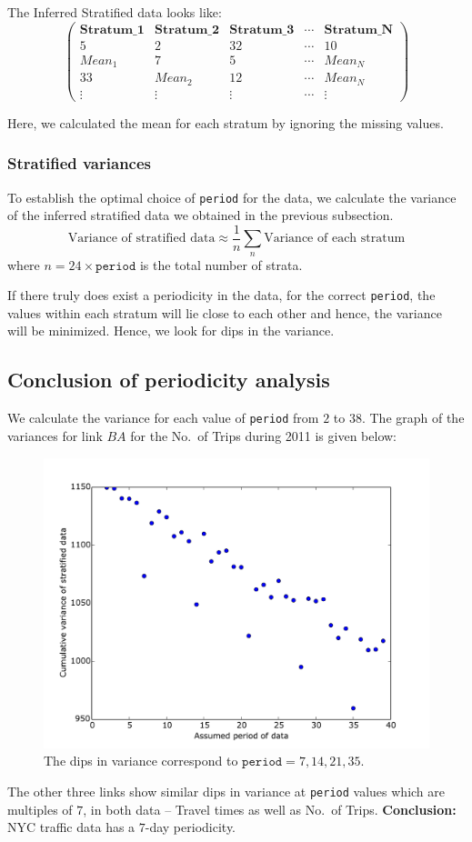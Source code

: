 \documentclass[10pt,a4paper]{amsart}
\begin{document}
The Inferred Stratified data looks like:
	\[ \left( \begin{array}{ccccc}
	\mathbf{Stratum\_1} & \mathbf{Stratum\_2} & \mathbf{Stratum\_3} & \cdots &
		\mathbf{Stratum\_N} \\
	5 & 2 & 32 & \cdots & 10 \\
	Mean_1 & 7 & 5 & \cdots & Mean_N \\
	33 & Mean_2 & 12 & \cdots & Mean_N \\
	\vdots & \vdots & \vdots & \cdots & \vdots
	\end{array} \right)\]

Here, we calculated the mean for each stratum by ignoring the missing values.

\subsubsection{Stratified variances}
To establish the optimal choice of \texttt{period} for the data, we calculate
the variance of the inferred stratified data we obtained in the previous
subsection.
	\[\text{Variance of stratified data} \approx \frac{1}{n}
		\sum_n{\text{Variance of each stratum}}\]
where \(n=24\times\mathtt{period}\) is the total number of strata.

If there truly does exist a periodicity in the data, for the correct
\texttt{period}, the values within each stratum will lie close to each other
and hence, the variance will be minimized. Hence, we look for dips in the
variance.

\subsection{Conclusion of periodicity analysis}
We calculate the variance for each value of \texttt{period} from \(2\) to
\(38\). The graph of the variances for link \(BA\) for the No.\ of Trips
during 2011 is given below:

\begin{figure}[hbtp]
\centering
\caption{The dips in variance correspond to \(\mathtt{period}=7,14,21,35\).}
\includegraphics[scale=0.5]{Periodicity_analysis_BA_Trips.pdf}
\end{figure}

The other three links show similar dips in variance at \texttt{period} values
which are multiples of \(7\), in both data -- Travel times as well as No.\ of
Trips. \textbf{Conclusion:} NYC traffic data has a \(7\)-day periodicity.
\end{document}
